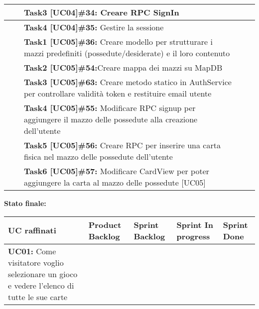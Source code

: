 \documentclass{article}
\begin{document}
\begin{itemize}
\begin{tabular}{ | p{3.5cm} | p{1.5cm} | p{5cm} | p{1.6cm} | p{1.6cm} | }
            \hline
            & & \textbf{Task3 [UC04]\#34:} Creare RPC SignIn                                                                             &                                                                                                    & \\
            \hline
            & & \textbf{Task4 [UC04]\#35:} Gestire la sessione                                                                           &                                                                                                    & \\
            \hline
            & & \textbf{Task1 [UC05]\#36:} Creare modello per strutturare i mazzi predefiniti (possedute/desiderate) e il loro contenuto  & & \\
            \hline
            & & \textbf{Task2 [UC05]\#54:}Creare mappa dei mazzi su MapDB                                                                &                                                                                                    & \\
            \hline
            & & \textbf{Task3 [UC05]\#63:} Creare metodo statico in AuthService per controllare validità token e restituire email utente  & & \\
            \hline
            & & \textbf{Task4 [UC05]\#55:} Modificare RPC signup per aggiungere il mazzo delle possedute alla creazione dell'utente  & & \\
            \hline
            & & \textbf{Task5 [UC05]\#56:} Creare RPC per inserire una carta fisica nel mazzo delle possedute dell'utente  & & \\
            \hline
            & & \textbf{Task6 [UC05]\#57:} Modificare CardView per poter aggiungere la carta al mazzo delle possedute [UC05] #57 & & \\
            \hline
        \end{tabular}
        \newpage
        \textbf{Stato finale:}
        \newline
        \newline
        \begin{tabular}{ | p{2.4cm} | p{1.4cm} | p{2.7cm} | p{3.4cm} | p{3cm} | }
            \hline
            \textbf{UC raffinati}
            & \textbf{Product Backlog}
            & \textbf{Sprint Backlog}
            & \textbf{Sprint In progress}
            & \textbf{Sprint Done} \\
            \hline
            \textbf{UC01:} Come visitatore voglio selezionare un gioco e vedere l'elenco di tutte le sue carte

\end{tabular}
\end{itemize}
\end{document}
